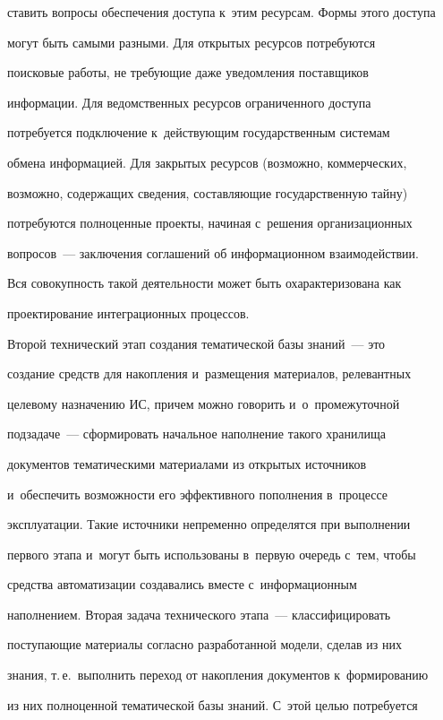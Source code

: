 ставить вопросы обеспечения доступа к~этим ресурсам. Формы этого доступа 

могут быть самыми разными. Для открытых ресурсов потребуются 

поисковые работы, не требующие даже уведомления поставщиков 

информации. Для ведомственных ресурсов ограниченного доступа 

потребуется подключение к~действующим государственным системам 

обмена информацией. Для закрытых ресурсов (возможно, коммерческих, 

возможно, содержащих сведения, составляющие государственную тайну) 

потребуются полноценные проекты, начиная с~решения организационных 

вопросов~--- заключения соглашений об информационном взаимодействии. 

Вся совокупность такой деятельности может быть охарактеризована как 

проектирование интеграционных процессов.



     

     Второй технический этап создания тематической базы знаний~--- это 

создание средств для накопления и~размещения материалов, релевантных 

целевому назначению ИС, причем можно говорить и~о~промежуточной 

подзадаче~--- сформировать начальное наполнение такого хранилища 

документов тематическими материалами из открытых источников 

и~обеспечить возможности его эффективного пополнения в~процессе 

эксплуатации. Такие источники непременно определятся при выполнении 

первого этапа и~могут быть использованы в~первую очередь с~тем, чтобы 

средства автоматизации создавались вместе с~информационным 

наполнением. Вторая задача технического этапа~--- классифицировать 

поступающие материалы согласно разработанной модели, сделав из них 

знания, т.\,е.\ выполнить переход от накопления документов к~формированию 

из них полноценной тематической базы знаний. С~этой целью потребуется 

